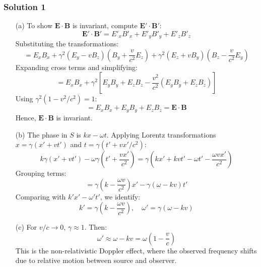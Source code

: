 \documentclass{article}
\begin{document}
\subsubsection{Solution 1}
\begin{enumerate}
    \item[(a)] To show \(\mathbf{E} \cdot \mathbf{B}\) is invariant, compute \(\mathbf{E}' \cdot \mathbf{B}'\):
        \[
        \mathbf{E}' \cdot \mathbf{B}' = E'_x B'_x + E'_y B'_y + E'_z B'_z
        \]
        Substituting the transformations:
        \[
        = E_x B_x + \gamma^2 (E_y - v B_z)\left(B_y + \frac{v}{c^2} E_z\right) + \gamma^2 (E_z + v B_y)\left(B_z - \frac{v}{c^2} E_y\right)
        \]
        Expanding cross terms and simplifying:
        \[
        = E_x B_x + \gamma^2 \left[E_y B_y + E_z B_z - \frac{v^2}{c^2}(E_y B_y + E_z B_z)\right]
        \]
        Using \(\gamma^2 (1 - v^2/c^2) = 1\):
        \[
        = E_x B_x + E_y B_y + E_z B_z = \mathbf{E} \cdot \mathbf{B}
        \]
        Hence, \(\mathbf{E} \cdot \mathbf{B}\) is invariant.
    
    \item[(b)] The phase in \(S\) is \(kx - \omega t\). Applying Lorentz transformations \(x = \gamma(x' + vt')\) and \(t = \gamma(t' + vx'/c^2)\):
        \[
        k\gamma(x' + vt') - \omega\gamma\left(t' + \frac{vx'}{c^2}\right) = \gamma\left(kx' + kv t' - \omega t' - \frac{\omega v x'}{c^2}\right)
        \]
        Grouping terms:
        \[
        = \gamma\left(k - \frac{\omega v}{c^2}\right)x' - \gamma(\omega - kv)t'
        \]
        Comparing with \(k'x' - \omega't'\), we identify:
        \[
        k' = \gamma\left(k - \frac{\omega v}{c^2}\right), \quad \omega' = \gamma(\omega - kv)
        \]
    
    \item[(c)] For \(v/c \to 0\), \(\gamma \approx 1\). Then:
        \[
        \omega' \approx \omega - kv = \omega\left(1 - \frac{v}{c}\right)
        \]
        This is the non-relativistic Doppler effect, where the observed frequency shifts due to relative motion between source and observer.
\end{enumerate}
\end{document}

